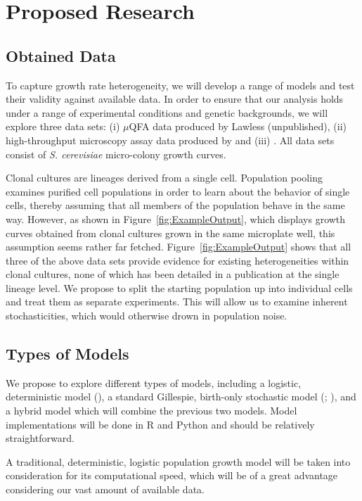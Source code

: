 \documentclass{bioinfo}
\begin{document}
\section{Proposed Research}

\subsection{Obtained Data}

To capture growth rate heterogeneity, we will develop a range of models and test their validity against available data. In order to ensure that our analysis holds under a range of experimental conditions and genetic backgrounds, we will explore three data sets: (i) $\mu$QFA data produced by Lawless (unpublished), (ii) high-throughput microscopy assay data produced by \citealp{Levy12} and (iii) \citealp{Ziv13}. All data sets consist of \textit{S. cerevisiae} micro-colony growth curves.

Clonal cultures are lineages derived from a single cell. Population pooling examines purified cell populations in order to learn about the behavior of single cells, thereby assuming that all members of the population behave in the same way. However, as shown in Figure~\ref{fig:ExampleOutput}, which displays growth curves obtained from clonal cultures grown in the same microplate well, this assumption seems rather far fetched. Figure~\ref{fig:ExampleOutput} shows that all three of the above data sets provide evidence for existing heterogeneities within clonal cultures, none of which has been detailed in a publication at the single lineage level. We propose to split the starting population up into individual cells and treat them as separate experiments. This will allow us to examine inherent stochasticities, which would otherwise drown in population noise. 

\subsection{Types of Models}

We propose to explore different types of models, including a logistic, deterministic model (\citealp{Verhulst45}), a standard Gillespie, birth-only stochastic model (\citealp{Bailey64}; \citealp{Gillespie77}), and a hybrid model which will combine the previous two models. Model implementations will be done in R and Python and should be relatively straightforward. 

A traditional, deterministic, logistic population growth model will be taken into consideration for its computational speed, which will be of a great advantage considering our vast amount of available data.
\end{document}
